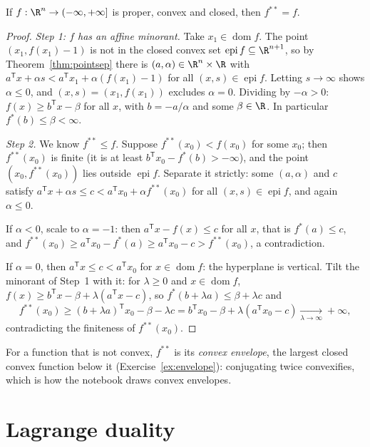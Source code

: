 \begin{theorem}\label{thm:fenchelmoreau}
If $f:\R^n\to(-\infty,+\infty]$ is proper, convex and closed, then $f^{**}=f$.
\end{theorem}
\begin{proof}
\emph{Step 1: $f$ has an affine minorant.} Take $x_1\in\operatorname{dom}f$. The point $(x_1,f(x_1)-1)$ is not in the closed convex set $\operatorname{epi}f\subseteq\R^{n+1}$, so by
Theorem~\ref{thm:pointsep} there is $(a,\alpha)\in\R^n\times\R$ with $a^{\mathsf T}x+\alpha s<a^{\mathsf T}x_1+\alpha(f(x_1)-1)$ for all $(x,s)\in\operatorname{epi}f$. Letting $s\to\infty$ shows
$\alpha\le0$, and $(x,s)=(x_1,f(x_1))$ excludes $\alpha=0$. Dividing by $-\alpha>0$: $f(x)\ge b^{\mathsf T}x-\beta$ for all $x$, with $b=-a/\alpha$ and some $\beta\in\R$. In particular
$f^*(b)\le\beta<\infty$.

\emph{Step 2.} We know $f^{**}\le f$. Suppose $f^{**}(x_0)<f(x_0)$ for some $x_0$; then $f^{**}(x_0)$ is finite (it is at least $b^{\mathsf T}x_0-f^*(b)>-\infty$), and the point
$(x_0,f^{**}(x_0))$ lies outside $\operatorname{epi}f$. Separate it strictly: some $(a,\alpha)$ and $c$ satisfy $a^{\mathsf T}x+\alpha s\le c<a^{\mathsf T}x_0+\alpha f^{**}(x_0)$ for all
$(x,s)\in\operatorname{epi}f$, and again $\alpha\le0$.

If $\alpha<0$, scale to $\alpha=-1$: then $a^{\mathsf T}x-f(x)\le c$ for all $x$, that is $f^*(a)\le c$, and $f^{**}(x_0)\ge a^{\mathsf T}x_0-f^*(a)\ge a^{\mathsf T}x_0-c>f^{**}(x_0)$, a
contradiction.

If $\alpha=0$, then $a^{\mathsf T}x\le c<a^{\mathsf T}x_0$ for $x\in\operatorname{dom}f$: the hyperplane is vertical. Tilt the minorant of Step~1 with it: for $\lambda\ge0$ and
$x\in\operatorname{dom}f$, $f(x)\ge b^{\mathsf T}x-\beta+\lambda(a^{\mathsf T}x-c)$, so $f^*(b+\lambda a)\le\beta+\lambda c$ and
\[
f^{**}(x_0)\ge(b+\lambda a)^{\mathsf T}x_0-\beta-\lambda c=b^{\mathsf T}x_0-\beta+\lambda(a^{\mathsf T}x_0-c)\xrightarrow[\lambda\to\infty]{}+\infty,
\]
contradicting the finiteness of $f^{**}(x_0)$.
\end{proof}

For a function that is not convex, $f^{**}$ is its \emph{convex envelope}, the largest closed convex function below it (Exercise~\ref{ex:envelope}): conjugating twice
convexifies, which is how the notebook draws convex envelopes.

\section{Lagrange duality}\label{sec:lagrange}

